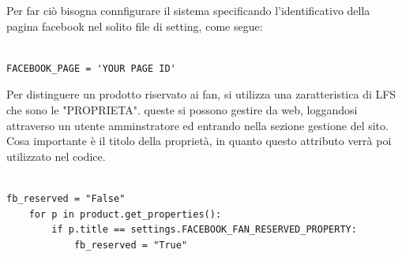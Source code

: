 Per far ciò bisogna connfigurare il sistema specificando l'identificativo della pagina facebook nel solito file di setting, come segue:

\begin{figure}
\hspace{5mm}
\end{figure}

%

\begin{lstlisting}

FACEBOOK_PAGE = 'YOUR PAGE ID'

\end{lstlisting}

Per distinguere un prodotto riservato ai fan, si utilizza una zaratteristica di LFS che sono le "PROPRIETA". queste si possono gestire da web, loggandosi attraverso un utente amminstratore ed entrando nella sezione gestione del sito. Cosa importante è il titolo della proprietà, in quanto questo attributo verrà poi utilizzato nel codice.

\begin{lstlisting}

fb_reserved = "False"
    for p in product.get_properties():
        if p.title == settings.FACEBOOK_FAN_RESERVED_PROPERTY:
            fb_reserved = "True"
            
\end{lstlisting}

